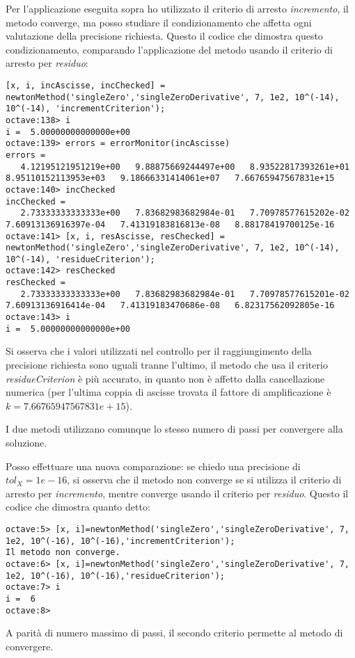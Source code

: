 \begin{oss}
Per l'applicazione eseguita sopra ho utilizzato il criterio di arresto
\emph{incremento}, il metodo converge, ma posso studiare il condizionamento che
affetta ogni valutazione della precisione richiesta. Questo il codice che
dimostra questo condizionamento, comparando l'applicazione del metodo usando il
criterio di arresto per \emph{residuo}:
\begin{lstlisting}
[x, i, incAscisse, incChecked] = newtonMethod('singleZero','singleZeroDerivative', 7, 1e2, 10^(-14), 10^(-14), 'incrementCriterion');
octave:138> i
i =  5.00000000000000e+00
octave:139> errors = errorMonitor(incAscisse)
errors =
   4.12195121951219e+00   9.88875669244497e+00   8.93522817393261e+01   8.95110152113953e+03   9.18666331414061e+07   7.66765947567831e+15
octave:140> incChecked 
incChecked =
   2.73333333333333e+00   7.83682983682984e-01   7.70978577615202e-02   7.60913136916397e-04   7.41319183816813e-08   8.88178419700125e-16
octave:141> [x, i, resAscisse, resChecked] = newtonMethod('singleZero','singleZeroDerivative', 7, 1e2, 10^(-14), 10^(-14), 'residueCriterion');
octave:142> resChecked 
resChecked =
   2.73333333333333e+00   7.83682983682984e-01   7.70978577615201e-02   7.60913136916414e-04   7.41319183470686e-08   6.82317562092805e-16
octave:143> i
i =  5.00000000000000e+00
\end{lstlisting}
Si osserva che i valori utilizzati nel controllo per il raggiungimento della
precisione richiesta sono uguali tranne l'ultimo, il metodo che usa il criterio
\emph{residueCriterion} \`e pi\`u accurato, in quanto non \`e affetto dalla
cancellazione numerica (per l'ultima coppia di ascisse trovata il fattore di
amplificazione \`e $k = 7.66765947567831e+15$). 

I due metodi utilizzano comunque
lo stesso numero di passi per convergere alla soluzione.
\end{oss}

\begin{oss}
Posso effettuare una nuova comparazione: se chiedo una precisione di $tol_{X}
= 1e-16$, si osserva che il metodo non converge se si utilizza il criterio di 
arresto per \emph{incremento}, mentre converge usando il criterio per
\emph{residuo}. Questo il codice che dimostra quanto detto:
\begin{lstlisting}
octave:5> [x, i]=newtonMethod('singleZero','singleZeroDerivative', 7, 1e2, 10^(-16), 10^(-16),'incrementCriterion');
Il metodo non converge.
octave:6> [x, i]=newtonMethod('singleZero','singleZeroDerivative', 7, 1e2, 10^(-16), 10^(-16),'residueCriterion');
octave:7> i
i =  6
octave:8>
\end{lstlisting}
A parit\`a di numero massimo di passi, il secondo criterio permette al metodo di
convergere.
\end{oss}


